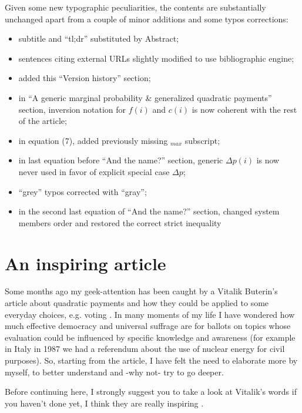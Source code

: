 \documentclass[10pt,a4paper]{article}
\begin{document}
	Given some new typographic peculiarities, the contents are substantially unchanged apart from a couple of minor additions and some typos corrections:
	\begin{itemize}
		\item subtitle and \enquote{tl;dr} substituted by Abstract;
		\item sentences citing external URLs slightly modified to use bibliographic engine;
		\item added this \enquote{Version history} section;
		\item in \enquote{A generic marginal probability \& generalized quadratic payments} section, inversion notation for $f(i)$ and $c(i)$ is now coherent with the rest of the article;
		\item in equation (7), added  previously missing $_{max}$ subscript;
		\item in last equation before \enquote{And the name?} section, generic $\Delta p(i)$ is now never used in favor of explicit special case $\Delta p$;
		\item \enquote{grey} typos corrected with \enquote{gray};
		\item in the second last equation of \enquote{And the name?} section, changed system members order and restored the correct strict inequality 
	\end{itemize}
	
	\section{An inspiring article}
	Some months ago my geek-attention has been caught by a Vitalik Buterin’s article about quadratic payments and how they could be applied to some everyday choices, e.g. voting \cite{Vitalik}. In many moments of my life I have wondered how much effective democracy and universal suffrage are for ballots on topics whose evaluation could be influenced by specific knowledge and awareness (for example in Italy in 1987 we had a referendum about the use of nuclear energy for civil purposes). So, starting from the article, I have felt the need to elaborate more by myself, to better understand and -why not- try to go deeper.
	
	Before continuing here, I strongly suggest you to take a look at Vitalik’s words if you haven’t done yet, I think they are really inspiring \cite{Vitalik}.
	
\end{document}
